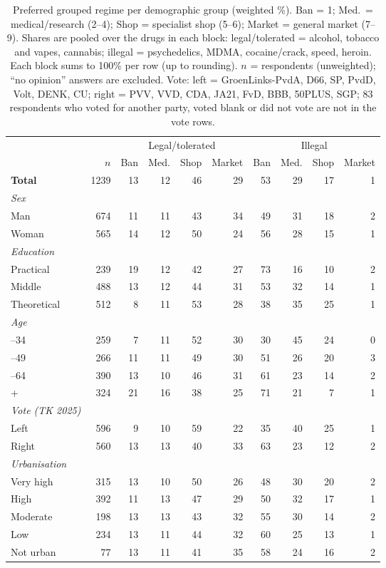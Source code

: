 \begin{table}[H]
\centering\small
\caption{Preferred grouped regime per demographic group (weighted \%). Ban = 1; Med.\ = medical/research (2--4); Shop = specialist shop (5--6); Market = general market (7--9). Shares are pooled over the drugs in each block: legal/tolerated = alcohol, tobacco and vapes, cannabis; illegal = psychedelics, MDMA, cocaine/crack, speed, heroin. Each block sums to 100\% per row (up to rounding). $n$ = respondents (unweighted); ``no opinion'' answers are excluded. Vote: left = GroenLinks-PvdA, D66, SP, PvdD, Volt, DENK, CU; right = PVV, VVD, CDA, JA21, FvD, BBB, 50PLUS, SGP; 83 respondents who voted for another party, voted blank or did not vote are not in the vote rows.}
\label{tab:regimes_demographics}
\begin{tabular}{@{}lrrrrrrrrr@{}}
\toprule
 & & \multicolumn{4}{c}{Legal/tolerated} & \multicolumn{4}{c}{Illegal} \\
\cmidrule(lr){3-6}\cmidrule(l){7-10}
 & $n$ & Ban & Med. & Shop & Market & Ban & Med. & Shop & Market \\
\midrule
\textbf{Total} & 1239 & 13 & 12 & 46 & 29 & 53 & 29 & 17 & 1 \\
\addlinespace
\textit{Sex} \\
\quad Man & 674 & 11 & 11 & 43 & 34 & 49 & 31 & 18 & 2 \\
\quad Woman & 565 & 14 & 12 & 50 & 24 & 56 & 28 & 15 & 1 \\
\addlinespace
\textit{Education} \\
\quad Practical & 239 & 19 & 12 & 42 & 27 & 73 & 16 & 10 & 2 \\
\quad Middle & 488 & 13 & 12 & 44 & 31 & 53 & 32 & 14 & 1 \\
\quad Theoretical & 512 & 8 & 11 & 53 & 28 & 38 & 35 & 25 & 1 \\
\addlinespace
\textit{Age} \\
\quad 18--34 & 259 & 7 & 11 & 52 & 30 & 30 & 45 & 24 & 0 \\
\quad 35--49 & 266 & 11 & 11 & 49 & 30 & 51 & 26 & 20 & 3 \\
\quad 50--64 & 390 & 13 & 10 & 46 & 31 & 61 & 23 & 14 & 2 \\
\quad 65+ & 324 & 21 & 16 & 38 & 25 & 71 & 21 & 7 & 1 \\
\addlinespace
\textit{Vote (TK 2025)} \\
\quad Left & 596 & 9 & 10 & 59 & 22 & 35 & 40 & 25 & 1 \\
\quad Right & 560 & 13 & 13 & 40 & 33 & 63 & 23 & 12 & 2 \\
\addlinespace
\textit{Urbanisation} \\
\quad Very high & 315 & 13 & 10 & 50 & 26 & 48 & 30 & 20 & 2 \\
\quad High & 392 & 11 & 13 & 47 & 29 & 50 & 32 & 17 & 1 \\
\quad Moderate & 198 & 13 & 13 & 43 & 32 & 55 & 30 & 14 & 2 \\
\quad Low & 234 & 13 & 11 & 44 & 32 & 60 & 25 & 13 & 1 \\
\quad Not urban & 77 & 13 & 11 & 41 & 35 & 58 & 24 & 16 & 2 \\
\bottomrule
\end{tabular}
\end{table}
